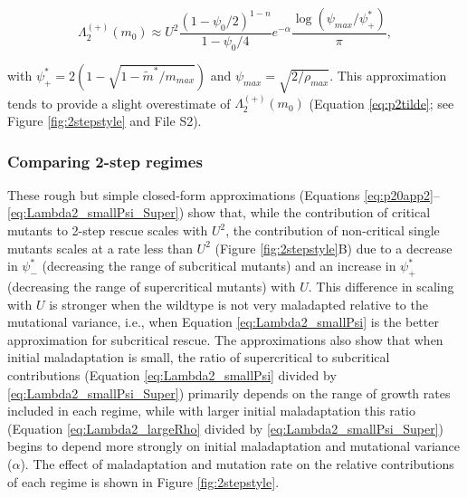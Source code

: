 \documentclass[9pt,twocolumn,twoside,lineno]{gsajnl}
\begin{document}
\begin{equation}\label{eq:Lambda2_smallPsi_Super}
\Lambda_2^{(+)}(m_0) \approx U^2 \frac{(1-\psi_0/2)^{1-n}}{1-\psi_0/4} e^{-\alpha} \frac{\log(\psi_{max} / \psi^*_{+})}{\pi},
\end{equation}

\noindent with $\psi^*_{+} = 2(1-\sqrt{1 - \tilde{m}^*/m_{max}})$ and $\psi_{max} = \sqrt{2/\rho_{max}}$.
This approximation tends to provide a slight overestimate of $\Lambda_2^{(+)}(m_0)$ (Equation \ref{eq:p2tilde}; see Figure \ref{fig:2stepstyle} and File S2).

\subsubsection{Comparing 2-step regimes}

These rough but simple closed-form approximations (Equations \ref{eq:p20app2}--\ref{eq:Lambda2_smallPsi_Super}) show that, while the contribution of critical mutants to 2-step rescue scales with $U^2$, the contribution of non-critical single mutants scales at a rate less than $U^2$ (Figure \ref{fig:2stepstyle}B) due to a decrease in $\psi^*_-$ (decreasing the range of subcritical mutants) and an increase in $\psi^*_+$ (decreasing the range of supercritical mutants) with $U$.
This difference in scaling with $U$ is stronger when the wildtype is not very maladapted relative to the mutational variance, i.e., when Equation \ref{eq:Lambda2_smallPsi} is the better approximation for subcritical rescue.
The approximations also show that when initial maladaptation is small, the ratio of supercritical to subcritical contributions (Equation \ref{eq:Lambda2_smallPsi} divided by \ref{eq:Lambda2_smallPsi_Super}) primarily depends on the range of growth rates included in each regime, while with larger initial maladaptation this ratio (Equation \ref{eq:Lambda2_largeRho} divided by \ref{eq:Lambda2_smallPsi_Super}) begins to depend more strongly on initial maladaptation and mutational variance ($\alpha$).
The effect of maladaptation and mutation rate on the relative contributions of each regime is shown in Figure \ref{fig:2stepstyle}.
\end{document}

